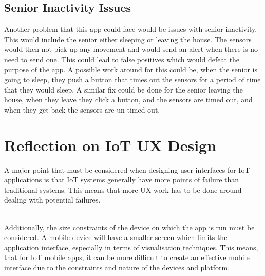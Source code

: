 \documentclass[a4paper, 11pt]{article}
\begin{document}
\subsection{Senior Inactivity Issues}

Another problem that this app could face would be issues with senior inactivity. This would include the senior either sleeping or leaving the house. The sensors would then not pick up any movement and would send an alert when there is no need to send one. This could lead to false positives which would defeat the purpose of the app. A possible work around for this could be, when the senior is going to sleep, they push a button that times out the sensors for a period of time that they would sleep. A similar fix could be done for the senior leaving the house, when they leave they click a button, and the sensors are timed out, and when they get back the sensors are un-timed out.

\section{Reflection on IoT UX Design}

A major point that must be considered when designing user interfaces for IoT applications is that IoT systems generally have more points of failure than traditional systems. This means that more UX work has to be done around dealing with potential failures.

~\\
Additionally, the size constraints of the device on which the app is run must be considered. A mobile device will have a smaller screen which limits the application interface, especially in terms of visualisation techniques. This means, that for IoT mobile apps, it can be more difficult to create an effective mobile interface due to the constraints and nature of the devices and platform.
\end{document}
